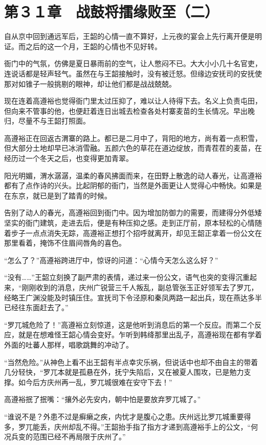 \section{第３１章　战鼓将擂缘败至（二）}

自从京中回到通远军后，王韶的心情一直不算好，上元夜的宴会上先行离开便是明证。而之后的这一个月，王韶的心情也不见好转。

衙门中的气氛，仿佛是夏日暴雨前的空气，让人憋闷不已。大大小小几十名官吏，连说话都是轻声轻气。虽然在与王韶接触时，没有被迁怒。但缘边安抚司的安抚使那对如锥子一般挑剔的眼神，却让他们都是战战兢兢。

现在连着高遵裕也觉得衙门里太过压抑了，难以让人待得下去。名义上负责屯田，但向来不管事的他，也便赶着连日出城去检查各处村寨麦苗的生长情况。早出晚归，尽量不与王韶打照面。

高遵裕正在回返古渭寨的路上。都已是二月中了，背阳的地方，尚有着一点积雪，但大部分土地却早已冰消雪融。五颜六色的草花在道边绽放，而青茬茬的麦苗，在经历过一个冬天之后，也变得更加青翠。

阳光明媚，渭水潺潺，温柔的春风拂面而来，在田野上散逸的动人春光，让高遵裕都有了点作诗的兴头。比起阴郁的衙门，当然是外面更让人觉得心中畅快。如果是在东京，就已是到了踏青的时候。

告别了动人的春光，高遵裕回到衙门中。因为增加防御力的需要，而建得分外低矮坚实的衙门建筑，走进去后，便是有种压抑之感。走到正厅前，原本轻松的心情随着步子一点点消失无踪，高遵裕正想打个招呼就离开，却见王韶正拿着一份公文在那里看着，掩饰不住眉间唇角的喜色。

“怎么了？”高遵裕跨进厅中，惊讶的问道：“心情今天怎么这么好？”

“没有……”王韶立刻换了副严肃的表情，递过来一份公文，语气也突的变得沉重起来，“刚刚收到的消息，庆州广锐营三千人叛乱，副总管张玉正好领军去了罗兀，经略王广渊没能及时镇压住。宣抚司下令泾原和秦凤两路一起出兵，现在燕达多半已经往东面赶去了。”

“罗兀城危险了！”高遵裕立刻惊道，这是他听到消息后的第一个反应。而第二个反应，就是在想难怪王韶心情会变好。乍听到韩绛那里出乱子，高遵裕现在都有学着外面的吐蕃人那样，唱歌跳舞的冲动了。

“当然危险。”从神色上看不出王韶有半点幸灾乐祸，但说话中也却不由自主的带着几分轻快，“罗兀本就是孤悬在外，抚宁失陷后，又在被夏人围攻，已是勉力支撑。如今后方庆州再一乱，罗兀城很难在安守下去！”

高遵裕抿了抿嘴：“攘外必先安内，朝中怕是要放弃罗兀城了。”

“谁说不是？外患不过是癣癞之疾，内忧才是腹心之患。庆州远比罗兀城重要得多，罗兀能丢，庆州却乱不得。”王韶抬手指了指方才递到高遵裕手上的公文，“何况兵变的范围已经不再局限于庆州了。”

